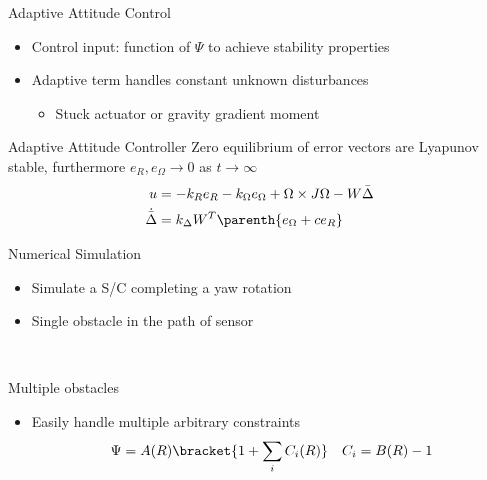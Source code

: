 \documentclass[11pt,professionalfonts]{beamer}
\begin{document}
\begin{frame}{Adaptive Attitude Control} %
\begin{itemize}
	\item Control input: function of \( \Psi \) to achieve stability properties
	\item Adaptive term handles constant unknown disturbances 
		\begin{itemize}
			\item Stuck actuator or gravity gradient moment
		\end{itemize}
\end{itemize}
\pause
	\begin{block}{Adaptive Attitude Controller}
		Zero equilibrium of error vectors are Lyapunov stable, furthermore \( e_R , e_\Omega \to 0 \) as \( t \to \infty \)
		\begin{align*}
			u &= - k_R e_R - k_{\Omega} e_{\Omega} + \Omega \times J \Omega - W \bar{\Delta} \\
			\dot{\bar{\Delta}} &= k_\Delta W^T \parenth{ e_\Omega + c e_R }
		\end{align*}
	\end{block}
	
\end{frame}   %

\begin{frame}{Numerical Simulation} %

\begin{itemize}
	\item Simulate a S/C completing a yaw rotation
	\item Single obstacle in the path of sensor
\end{itemize}

~

\end{frame}%

\begin{frame}{Multiple obstacles}%

\begin{itemize}
	\item Easily handle multiple arbitrary constraints 
	\begin{align*}
		\Psi = A(R) \bracket{1 + \sum_i C_i(R)} \quad C_i = B(R) - 1
	\end{align*}
\end{itemize}

\begin{figure}
	\centering
\end{figure}

\end{frame}%
\end{document}
